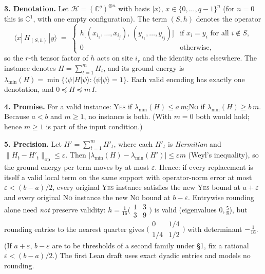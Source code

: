 \documentclass[10pt]{article}
\begin{document}
\textbf{3. Denotation.} Let $\mathcal{H}=(\mathbb{C}^{q})^{\otimes n}$ with basis $|x\rangle$, $x\in\{0,\dots,q-1\}^{n}$
(for $n=0$ this is $\mathbb{C}^{1}$, with one empty configuration). The term $(S,h)$ denotes the operator
\[
\langle x|\,H_{(S,h)}\,|y\rangle \;=\;
\begin{cases} h\big[(x_{i_1},\dots,x_{i_j}),\,(y_{i_1},\dots,y_{i_j})\big] & \text{if } x_i=y_i \text{ for all } i\notin S,\\
0 & \text{otherwise,}\end{cases}
\]
so the $r$-th tensor factor of $h$ acts on site $i_r$ and the identity acts elsewhere. The instance denotes
$H=\sum_{t=1}^{m}H_{t}$, and its ground energy is
$\lambda_{\min}(H)=\min\{\langle\psi|H|\psi\rangle : \langle\psi|\psi\rangle=1\}$.
Each valid encoding has exactly one denotation, and $0\preceq H\preceq m\,I$.

\textbf{4. Promise.} For a valid instance:\quad
\textsc{Yes} if $\lambda_{\min}(H)\le a\,m$;\qquad \textsc{No} if $\lambda_{\min}(H)\ge b\,m$.\\
Because $a<b$ and $m\ge 1$, no instance is both. (With $m=0$ both would hold; hence $m\ge 1$ is part of the input condition.)

\textbf{5. Precision.} Let $H'=\sum_{t=1}^{m}H'_t$, where each $H'_t$ is \emph{Hermitian} and
$\|H_t-H'_t\|_{\mathrm{op}}\le\varepsilon$. Then
$|\lambda_{\min}(H)-\lambda_{\min}(H')|\le \varepsilon m$ (Weyl's inequality), so the ground energy per term moves
by at most $\varepsilon$. Hence: if every replacement is itself a valid local term on the same support with
operator-norm error at most $\varepsilon<(b-a)/2$, every original \textsc{Yes} instance satisfies the new \textsc{Yes}
bound at $a+\varepsilon$ and every original \textsc{No} instance the new \textsc{No} bound at $b-\varepsilon$.
Entrywise rounding alone need \emph{not} preserve validity: $h=\tfrac1{16}\big(\begin{smallmatrix}1&3\\3&9\end{smallmatrix}\big)$
is valid (eigenvalues $0,\tfrac58$), but rounding entries to the nearest quarter gives
$\big(\begin{smallmatrix}0&1/4\\1/4&1/2\end{smallmatrix}\big)$ with determinant $-\tfrac1{16}$.
(If $a+\varepsilon$, $b-\varepsilon$ are to be thresholds of a second family under \S1, fix a rational $\varepsilon<(b-a)/2$.) The first Lean draft uses exact dyadic entries and models no rounding.
\end{document}
